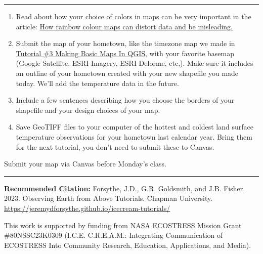 \documentclass[oneside,a4paper,11pt,explicit]{book}
\begin{document}
	
	\vspace{.25em}
	
	\hrule
	
	\vspace{1 em}
	
	\begin{tcolorbox}[colback=yellow!5!white,colframe=IceCreamOrbit,title= \vspace{.2em} \Large Map of the Week Assignments]
		\large
		\begin{enumerate}
			\item Read about how your choice of colors in maps can be very important in the article: \href{https://theconversation.com/how-rainbow-colour-maps-can-distort-data-and-be-misleading-167159}{How rainbow colour maps can distort data and be misleading.}
			\item Submit the map of your hometown, like the timezone map we made in \href{https://jeremydforsythe.github.io/icecream-tutorials/Tutorial3_MakingBasicMapsInQGIS/Tutorial3_MakingBasicMapsInQGIS.pdf}{Tutorial \#3 Making Basic Maps In QGIS}, with your favorite basemap (Google Satellite, ESRI Imagery, ESRI Delorme, etc,). Make sure it includes an outline of your hometown created with your new shapefile you made today. We'll add the temperature data in the future.  
			\item Include a few sentences describing how you choose the borders of your shapefile and your design choices of your map. 
			\item Save GeoTIFF files to your computer of the hottest and coldest land surface temperature observations for your hometown last calendar year. Bring them for the next tutorial, you don't need to submit these to Canvas.
		\end{enumerate}
		
		Submit your map via Canvas before Monday's class.
	\end{tcolorbox}
	
	\vfill
	
	\hrule
	
	\vspace{1em}
	
	\textbf{Recommended Citation:} Forsythe, J.D., G.R. Goldsmith, and J.B. Fisher. 2023. Observing Earth from Above Tutorials. Chapman University. \url{https://jeremydforsythe.github.io/icecream-tutorials/}
	
	\vspace{1em}
	
	This work is supported by funding from NASA ECOSTRESS Mission Grant \#80NSSC23K0309 (I.C.E. C.R.E.A.M.: Integrating Communication of ECOSTRESS Into Community Research, Education, Applications, and Media).
	
\end{document}
